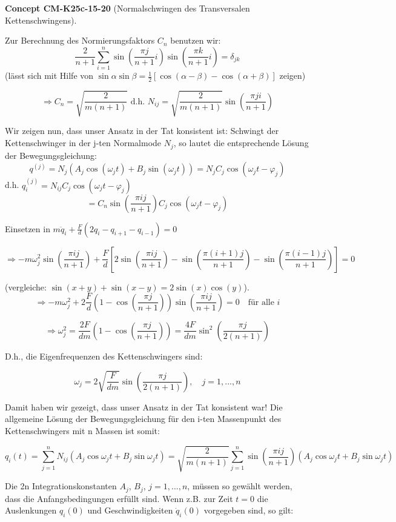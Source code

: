 \documentclass[10pt, letterpaper]{article}
\newcommand{\CustomHeading}[3]{%
  \par\medskip\noindent%
  \textbf{#1 #2} \textnormal{(#3)}.\enskip%
}
\newenvironment{CONC}[2]{\begin{unitbox}\CustomHeading{Concept}{#1}{#2}}{\end{unitbox}}
\begin{document}
\begin{CONC}{CM-K25c-15-20}{Normalschwingen des Transversalen Kettenschwingens}
Zur Berechnung des Normierungsfaktors $C_n$ benutzen wir:
\[
\frac{2}{n+1} \sum_{i=1}^n \sin\left(\frac{\pi j}{n+1}i\right)\sin\left(\frac{\pi k}{n+1}i\right) = \delta_{jk}
\]
(lässt sich mit Hilfe von $\sin\alpha\sin\beta = \frac{1}{2}[\cos(\alpha-\beta)-\cos(\alpha+\beta)]$ zeigen)

\[\Rightarrow C_n = \sqrt{\frac{2}{m(n+1)}} \text{ d.h. } N_{ij} = \sqrt{\frac{2}{m(n+1)}}\sin\left(\frac{\pi j i}{n+1}\right)\]

Wir zeigen nun, dass unser Ansatz in der Tat konsistent ist:
Schwingt der Kettenschwinger in der j-ten Normalmode $N_j$, so lautet
die entsprechende Lösung der Bewegungsgleichung:
\[
q^{(j)} = N_j \left(A_j \cos(\omega_j t) + B_j \sin(\omega_j t)\right)
= N_j C_j \cos(\omega_j t - \varphi_j)
\]
d.h. $q_i^{(j)} = N_{ij} C_j \cos(\omega_j t - \varphi_j)$
\[
= C_n \sin\left(\frac{\pi i j}{n+1}\right) C_j \cos(\omega_j t - \varphi_j)
\]

Einsetzen in $m\ddot{q}_i + \frac{F}{d}(2q_i - q_{i+1} - q_{i-1}) = 0$

\[\Rightarrow -m\omega_j^2 \sin\left(\frac{\pi i j}{n+1}\right) + \frac{F}{d}\left[2\sin\left(\frac{\pi i j}{n+1}\right) - \sin\left(\frac{\pi(i+1)j}{n+1}\right) - \sin\left(\frac{\pi(i-1)j}{n+1}\right)\right] = 0\]

(vergleiche: $\sin(x+y)+\sin(x-y) = 2\sin(x)\cos(y)$).
\[
\Rightarrow -m\omega_j^2 + 2\frac{F}{d}\left(1-\cos\left(\frac{\pi j}{n+1}\right)\right)\sin\left(\frac{\pi i j}{n+1}\right) = 0 \quad \text{für alle } i
\]

\[
\Rightarrow \omega_j^2 = \frac{2F}{dm}\left(1-\cos\left(\frac{\pi j}{n+1}\right)\right) = \frac{4F}{dm}\sin^2\left(\frac{\pi j}{2(n+1)}\right)
\]

D.h., die Eigenfrequenzen des Kettenschwingers sind:

\[
\omega_j = 2\sqrt{\frac{F}{dm}}\sin\left(\frac{\pi j}{2(n+1)}\right), \quad j=1,...,n
\]

Damit haben wir gezeigt, dass unser Ansatz in der Tat konsistent war!
Die allgemeine Lösung der Bewegungsgleichung für den i-ten Massenpunkt des Kettenschwingers mit n Massen ist somit:

\[
q_i(t) = \sum_{j=1}^n N_{ij}\left(A_j\cos\omega_jt + B_j\sin\omega_jt\right)
= \sqrt{\frac{2}{m(n+1)}}\sum_{j=1}^n\sin\left(\frac{\pi ij}{n+1}\right)(A_j\cos\omega_jt + B_j\sin\omega_jt)
\]

Die 2n Integrationskonstanten $A_j$, $B_j$, $j=1,...,n$, müssen so gewählt werden, dass die Anfangsbedingungen erfüllt sind. Wenn z.B. zur Zeit $t=0$ die Auslenkungen $q_i(0)$ und Geschwindigkeiten $\dot{q}_i(0)$ vorgegeben sind, so gilt:


\end{CONC}
\end{document}
